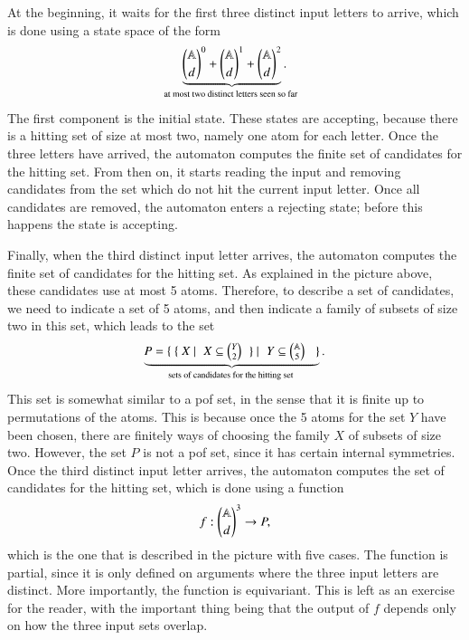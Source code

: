 \begin{myexample}
    At the beginning, it  waits for the first three distinct input letters to arrive, which is done using a state space of the form 
        \begin{align*}
    \myunderbrace{{\atoms \choose d}^0 + {\atoms \choose d}^1 + {\atoms \choose d}^2}{at most two distinct letters seen so far}.
        \end{align*}  
    The first component is the initial state. 
    These states are accepting, because there is a  hitting set of size at most two, namely one atom for each letter. Once the three letters have arrived, the automaton computes the finite set of candidates for the hitting set. From then on, it starts reading the input and removing candidates from the set which do not hit the current input letter. Once all candidates are removed, the automaton enters a rejecting state; before this happens the state is accepting. 

    Finally, when the third distinct input letter arrives, the automaton computes the finite set of candidates for the hitting set. As explained in the picture above, these candidates use at most 5 atoms. Therefore, to describe a set of candidates, we need to indicate a set of 5 atoms, and then indicate a family of subsets of size two in this set, which leads to the set 
    \begin{align*}
    \myunderbrace{
       P =   \setbuild{
            \setbuild{X}{$X \subseteq {Y \choose 2}$}
        }{
            $Y \subseteq {\atoms \choose 5}$
        }
    }{sets of candidates for the hitting set}.
    \end{align*}
    This set is somewhat similar to a pof set, in the sense that it is finite up to permutations of the atoms. This is because  once the 5 atoms for the set $Y$ have been chosen, there are finitely ways of choosing the family $X$ of subsets of size two. However, the set $P$ is not a pof set, since it has certain internal symmetries.     Once the third distinct input letter arrives, the automaton computes the set of candidates for the hitting set, which is done using a function 
    \begin{align*}
    f : {\mathbb A \choose d}^3 \to P,
    \end{align*}
    which is the one that is described in the picture with five cases. The function is partial, since it is only defined on arguments where the three input letters are distinct. More importantly, the function is equivariant. This is left as an exercise for the reader, with the important thing being that the output of $f$ depends only on how the three input sets overlap.
\end{myexample}




